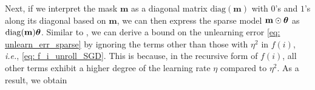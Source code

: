 Next, if we interpret the mask $\mathbf m$ as a diagonal matrix $\mathrm{diag}(\mathbf m)$ with $0$'s and $1$'s along its diagonal based on $\mathbf m$, we can then express the sparse model $\mathbf m \odot \boldsymbol{\theta}$ as $\mathrm{diag}(\mathbf m) \boldsymbol{\theta}$.
Similar to  \cite[Eq.\,9]{thudi2021unrolling}, we can derive a bound on the unlearning error \eqref{eq: unlearn_err_sparse} by ignoring the terms other than those with $\eta^2$ in $f(i)$, \textit{i.e.}, \eqref{eq: f_i_unroll_SGD}. 
This is because, in the recursive form of $f(i)$, all other terms exhibit a higher degree of the learning rate $\eta$ compared to $\eta^2$. As a result, we obtain
